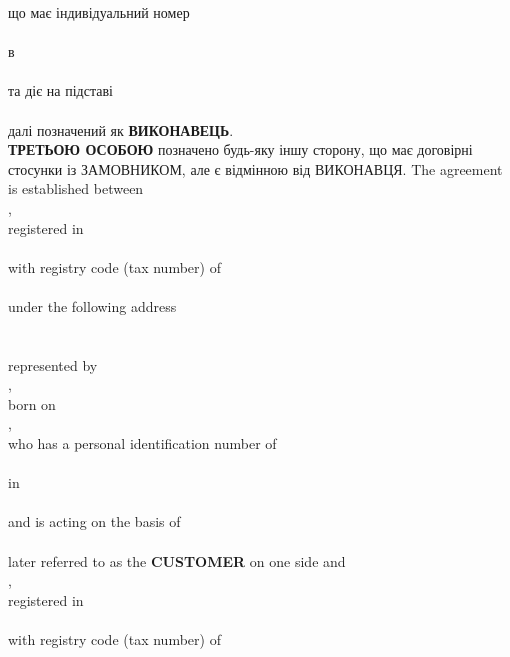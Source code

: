 \begin{Form}
\begin{paracol}{3}
{          що має індивідуальний номер\\
          \\
          в \\
          \\
          та діє на підставі\\
          \\
          далі позначений як \textbf{ВИКОНАВЕЦЬ}.\\
          \textbf{ТРЕТЬОЮ ОСОБОЮ} позначено будь-яку іншу сторону, що має договірні стосунки із ЗАМОВНИКОМ, але є відмінною від ВИКОНАВЦЯ.
        }
        { The agreement is established between \\
          ,\\
          registered in\\
          \\
          with registry code (tax number) of \\
          \\
          under the following address\\
          \\
          \\
          represented by\\
          ,\\
          born on\\
          ,\\
          who has a personal identification number of\\
          \\
          in \\
          \\
          and is acting on the basis of\\
          \\
          later referred to as the \textbf{CUSTOMER} on one side and \\
          ,\\
          registered in\\
          \\
          with registry code (tax number) of\\
}
\end{paracol}
\end{Form}
